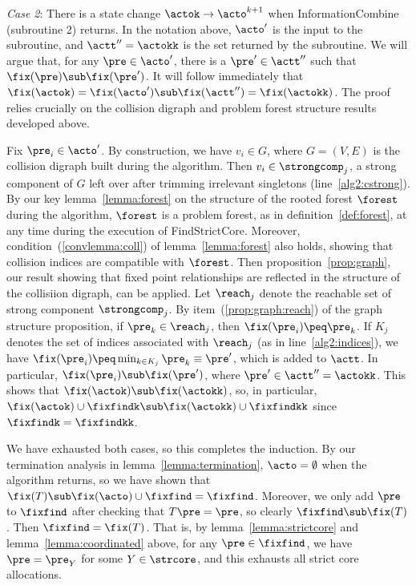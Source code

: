 \emph{Case 2}: There is a state change $\actok \to \acto^{k +1}$ when InformationCombine (subroutine 2) returns.
In the notation above, $\acto'$ is the input to the subroutine, and $\actt'' = \actokk$ is the set returned by the subroutine. 
We will argue that, for any $\pre \in \acto'$, there is a $\pre' \in \actt''$ such that $\fix(\pre) \sub \fix(\pre')$.
It will follow immediately that $\fix(\actok) = \fix(\acto') \sub \fix(\actt'') = \fix(\actokk)$.
The proof relies crucially on the collision digraph and problem forest structure results developed above.

Fix $\pre_i \in \acto'$.
By construction, we have $v_i \in G$, where $G = (V,E)$ is the collision digraph built during the algorithm.
Then $v_i \in \strongcomp_j$, a strong component of $G$ left over after trimming irrelevant singletons (line~\ref{alg2:cstrong}).
By our key lemma~\ref{lemma:forest} on the structure of the rooted forest $\forest$ during the algorithm, $\forest$ is a problem forest, as in definition~\ref{def:forest}, at any time during the execution of FindStrictCore.
Moreover, condition~(\ref{convlemma:coll}) of lemma~\ref{lemma:forest} also holds, showing that collision indices are compatible with $\forest$.
Then proposition~\ref{prop:graph}, our result showing that fixed point relationships are reflected in the structure of the collisiion digraph, can be applied. 
Let $\reach_j$ denote the reachable set of strong component $\strongcomp_j$.
By item~(\ref{prop:graph:reach}) of the graph structure proposition, if $\pre_k \in \reach_j$, then $\fix(\pre_i) \peq \pre_k$.
If $K_j$ denotes the set of indices associated with $\reach_j$ (as in line~\ref{alg2:indices}), we have $\fix(\pre_i) \peq \min_{k \in K_j} \pre_k \equiv \pre'$, which is added to $\actt$.
In particular, $\fix(\pre_i) \sub \fix(\pre')$, where $\pre' \in \actt'' = \actokk$.
This shows that $\fix(\actok) \sub \fix(\actokk)$, so, in particular, $\fix(\actok) \cup \fixfindk \sub \fix(\actokk) \cup \fixfindkk$ since $\fixfindk = \fixfindkk$.

We have exhausted both cases, so this completes the induction. 
By our termination analysis in lemma~\ref{lemma:termination}, $\acto = \emptyset$ when the algorithm returns, so we have shown that $\fix(T) \sub \fix(\acto) \cup \fixfind = \fixfind$.
Moreover, we only add $\pre$ to $\fixfind$ after checking that $T\pre = \pre$, so clearly $\fixfind \sub \fix(T)$.
Then $\fixfind = \fix(T)$. 
That is, by lemma~\ref{lemma:strictcore} and lemma~\ref{lemma:coordinated} above, for any $\pre \in \fixfind$, we have $\pre = \pre_Y$ for some $Y \in \strcore$, and this exhausts all strict core allocations. 
\eprf

